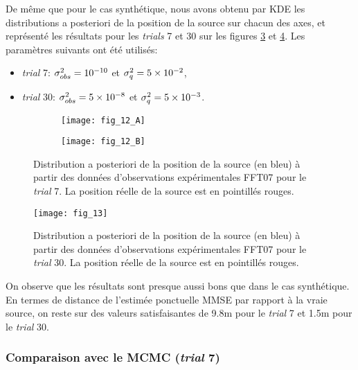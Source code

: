 {De même que pour le cas synthétique, nous avons {obtenu} par KDE les distributions a posteriori de la position de la source sur chacun des axes, et représenté les résultats pour les \textit{trials} 7 et 30 sur les figures \ref{fig_12_AE} et \ref{fig_13_AE}. Les paramètres suivants ont été utilisés:

\begin{itemize}
	\item \textit{trial} 7: ${\sigma_{obs}^2} = 10^{-10}$ et $\sigma_q^2 = 5\times 10^{-2}$,
	\item \textit{trial} 30: ${\sigma_{obs}^2} = 5 \times 10^{-8}$ et $\sigma_q^2 = 5\times 10^{-3}$.\\
\end{itemize}

\begin{figure}[h!]
	\centering
	\begin{subfigure}[t]{0.5\textwidth}
		\centering
		\texttt{[image: fig\_12\_A]}
		\caption{}
		\label{fig_12_A}
	\end{subfigure}%
	\begin{subfigure}[t]{0.5\textwidth}
		\centering
		\texttt{[image: fig\_12\_B]}
		\caption{}
		\label{fig_12_B}
	\end{subfigure}
	\caption{Distribution a posteriori de la position de la source (en bleu) à partir des données d'observations expérimentales FFT07 pour le \textit{trial} 7. La position réelle de la source est en pointillés rouges.} 
	\label{fig_12_AE}		
\end{figure}

\begin{figure}[h!]
	\centering
	\texttt{[image: fig\_13]}
	\caption{Distribution a posteriori de la position de la source (en bleu) à partir des données d'observations expérimentales FFT07 pour le \textit{trial} 30. La position réelle de la source est en pointillés rouges.}
	\label{fig_13_AE}
\end{figure}

On observe que les résultats sont presque aussi bons que dans le cas synthétique. En termes de distance de l'estimée ponctuelle MMSE par rapport à la vraie source, on reste sur des valeurs satisfaisantes de 9.8m pour le \textit{trial} 7 et 1.5m pour le \textit{trial} 30. 

\subsubsection{Comparaison avec le MCMC (\textit{trial} 7)}

}
